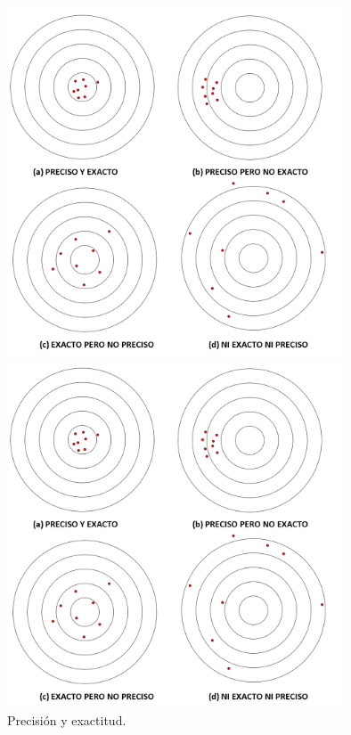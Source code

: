     \begin{figure}[h]
	\centering
	\begin{enColor}
	\includegraphics[width=10cm]{../fig/Cap01-PrecisionExactitud-2.png}
	\end{enColor}
	\begin{bn}
	\includegraphics[width=10cm]{../fig/Cap01-PrecisionExactitud-2.png}
	\end{bn}
	\caption{Precisión y exactitud.}
	\label{cap01:fig:PrecisionExactitud}
    \end{figure}

